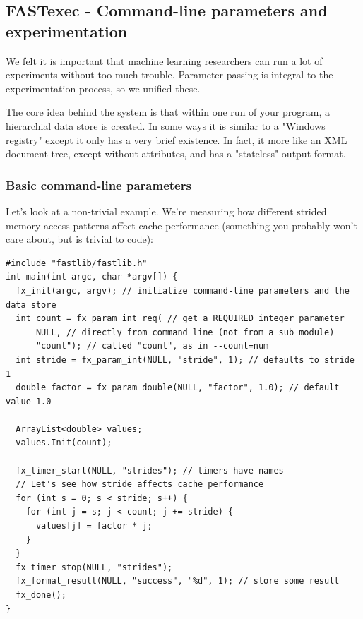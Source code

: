 \documentclass[letter]{report}
\begin{document}
\subsection{FASTexec - Command-line parameters and experimentation}

We felt it is important that machine learning researchers can run a lot of experiments without too much trouble. Parameter passing is integral to the experimentation process, so we unified these.

The core idea behind the system is that within one run of your program, a hierarchial data store is created. In some ways it is similar to a "Windows registry" except it only has a very brief existence. In fact, it more like an XML document tree, except without attributes, and has a "stateless" output format.

\subsubsection{Basic command-line parameters}

Let's look at a non-trivial example. We're measuring how different strided memory access patterns affect cache performance (something you probably won't care about, but is trivial to code):
\begin{verbatim}
#include "fastlib/fastlib.h"
int main(int argc, char *argv[]) {
  fx_init(argc, argv); // initialize command-line parameters and the data store
  int count = fx_param_int_req( // get a REQUIRED integer parameter
      NULL, // directly from command line (not from a sub module)
      "count"); // called "count", as in --count=num
  int stride = fx_param_int(NULL, "stride", 1); // defaults to stride 1
  double factor = fx_param_double(NULL, "factor", 1.0); // default value 1.0
  
  ArrayList<double> values;
  values.Init(count);

  fx_timer_start(NULL, "strides"); // timers have names
  // Let's see how stride affects cache performance
  for (int s = 0; s < stride; s++) {
    for (int j = s; j < count; j += stride) {
      values[j] = factor * j;
    }
  }
  fx_timer_stop(NULL, "strides");
  fx_format_result(NULL, "success", "%d", 1); // store some result
  fx_done();
}
\end{verbatim}
\end{document}
